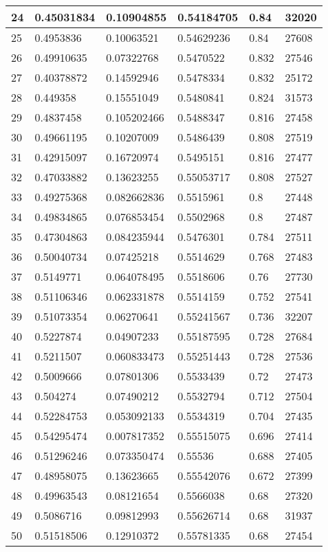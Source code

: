\begin{longtable}{|l|l|l|l|l|l|}
24 & 0.45031834 & 0.10904855 & 0.54184705 & 0.84 & 32020 \\ \hline 
25 & 0.4953836 & 0.10063521 & 0.54629236 & 0.84 & 27608 \\ \hline 
26 & 0.49910635 & 0.07322768 & 0.5470522 & 0.832 & 27546 \\ \hline 
27 & 0.40378872 & 0.14592946 & 0.5478334 & 0.832 & 25172 \\ \hline 
28 & 0.449358 & 0.15551049 & 0.5480841 & 0.824 & 31573 \\ \hline 
29 & 0.4837458 & 0.105202466 & 0.5488347 & 0.816 & 27458 \\ \hline 
30 & 0.49661195 & 0.10207009 & 0.5486439 & 0.808 & 27519 \\ \hline 
31 & 0.42915097 & 0.16720974 & 0.5495151 & 0.816 & 27477 \\ \hline 
32 & 0.47033882 & 0.13623255 & 0.55053717 & 0.808 & 27527 \\ \hline 
33 & 0.49275368 & 0.082662836 & 0.5515961 & 0.8 & 27448 \\ \hline 
34 & 0.49834865 & 0.076853454 & 0.5502968 & 0.8 & 27487 \\ \hline 
35 & 0.47304863 & 0.084235944 & 0.5476301 & 0.784 & 27511 \\ \hline 
36 & 0.50040734 & 0.07425218 & 0.5514629 & 0.768 & 27483 \\ \hline 
37 & 0.5149771 & 0.064078495 & 0.5518606 & 0.76 & 27730 \\ \hline 
38 & 0.51106346 & 0.062331878 & 0.5514159 & 0.752 & 27541 \\ \hline 
39 & 0.51073354 & 0.06270641 & 0.55241567 & 0.736 & 32207 \\ \hline 
40 & 0.5227874 & 0.04907233 & 0.55187595 & 0.728 & 27684 \\ \hline 
41 & 0.5211507 & 0.060833473 & 0.55251443 & 0.728 & 27536 \\ \hline 
42 & 0.5009666 & 0.07801306 & 0.5533439 & 0.72 & 27473 \\ \hline 
43 & 0.504274 & 0.07490212 & 0.5532794 & 0.712 & 27504 \\ \hline 
44 & 0.52284753 & 0.053092133 & 0.5534319 & 0.704 & 27435 \\ \hline 
45 & 0.54295474 & 0.007817352 & 0.55515075 & 0.696 & 27414 \\ \hline 
46 & 0.51296246 & 0.073350474 & 0.55536 & 0.688 & 27405 \\ \hline 
47 & 0.48958075 & 0.13623665 & 0.55542076 & 0.672 & 27399 \\ \hline 
48 & 0.49963543 & 0.08121654 & 0.5566038 & 0.68 & 27320 \\ \hline 
49 & 0.5086716 & 0.09812993 & 0.55626714 & 0.68 & 31937 \\ \hline 
50 & 0.51518506 & 0.12910372 & 0.55781335 & 0.68 & 27454 \\ \hline 
\end{longtable}